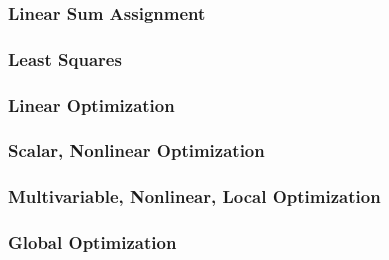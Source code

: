 \subsubsection{Linear Sum Assignment}

\subsubsection{Least Squares}

\subsubsection{Linear Optimization}

\subsubsection{Scalar, Nonlinear Optimization}

\subsubsection{Multivariable, Nonlinear, Local Optimization}

\subsubsection{Global Optimization}




